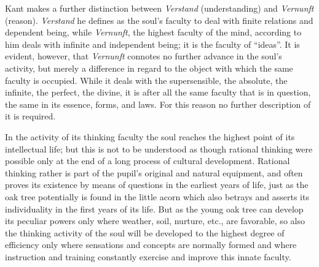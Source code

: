 Kant makes a further distinction between \emph{Verstand} (understanding) and \emph{Vernunft} (reason). \emph{Verstand} he defines as the soul’s faculty to deal with finite relations and dependent being, while \emph{Vernunft}, the highest faculty of the mind, according to him deals with infinite and independent being; it is the faculty of “ideas”. It is evident, however, that \emph{Vernunft} connotes no further advance in the soul’s activity, but
merely a difference in regard to the object with which the same faculty is occupied. While it deals with the supersensible, the absolute, the infinite, the perfect, the divine, it is after all the same faculty that is in question, the same in its essence, forms, and laws. For this reason no further description of it is required.

In the activity of its thinking faculty the soul reaches the highest point of its intellectual life; but this is not to be understood as though rational thinking were possible only at the end of a long process of cultural development. Rational thinking rather is part of the pupil’s original and natural equipment, and often proves its existence by means of questions in the earliest years of life, just as the oak tree potentially is found in the little acorn which also betrays and asserts its individuality in the first years of its life. But as the young oak tree can develop its peculiar powers only where weather, soil, nurture, etc., are favorable, so also the thinking activity of the soul will be developed to the highest degree of efficiency only where sensations and concepts are normally formed and where instruction and training constantly exercise and improve this innate faculty.

